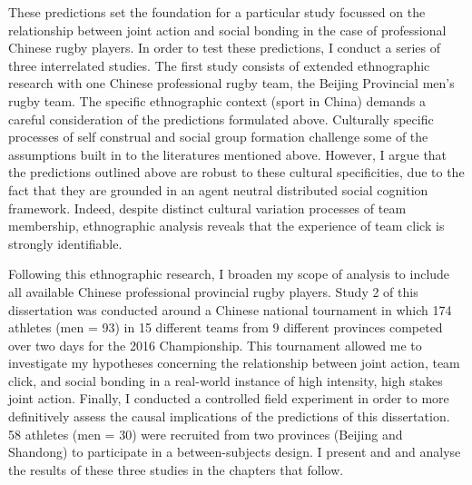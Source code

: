 These predictions set the foundation for a particular study focussed on the relationship between joint action and social bonding in the case of professional Chinese rugby players. In order to test these predictions, I conduct a series of three interrelated studies.  The first study consists of extended ethnographic research with one Chinese professional rugby team, the Beijing Provincial men's rugby team.  The specific ethnographic context (sport in China) demands a careful consideration of the predictions formulated above.  Culturally specific processes of self construal and social group formation challenge some of the assumptions built in to the literatures mentioned above.  However, I argue that the predictions outlined above are robust to these cultural specificities, due to the fact that they are grounded in an agent neutral distributed social cognition framework. Indeed, despite distinct cultural variation processes of team membership, ethnographic analysis reveals that the experience of team click is strongly identifiable.

Following this ethnographic research, I broaden my scope of analysis to include all available Chinese professional provincial rugby players.  Study 2 of this dissertation was conducted around a Chinese national tournament in which 174 athletes (men = 93) in 15 different teams from 9 different provinces competed over two days for the 2016 Championship.  This tournament allowed me to investigate my hypotheses concerning the relationship between joint action, team click, and social bonding in a real-world instance of high intensity, high stakes joint action.  Finally, I conducted a controlled field experiment in order to more definitively assess the causal implications of the predictions of this dissertation.  58 athletes (men = 30) were recruited from two provinces (Beijing and Shandong) to participate in a between-subjects design. I present and and analyse the results of these three studies in the chapters that follow.
